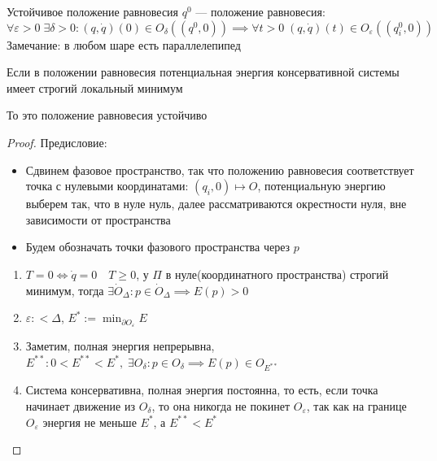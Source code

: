 \documentclass[crop=false]{standalone}
\begin{document}
\Def Устойчивое положение равновесия $q^0$ — положение равновесия:
\[\forall \varepsilon > 0 \; \exists \delta > 0: (q , \dot q)(0) \in O_\delta((q^0, 0)) \implies \forall t > 0 \; (q , \dot q)(t) \in O_\varepsilon((q_i^0, 0)) \]
Замечание: в любом шаре есть параллелепипед
\begin{theorem}
    Если в положении равновесия потенциальная энергия консервативной системы имеет строгий локальный минимум
    
    То это положение равновесия устойчиво
\end{theorem}
\begin{proof}
    Предисловие:
    \begin{itemize}
        \item 
        Сдвинем фазовое пространство, так что положению равновесия соответствует точка с нулевыми координатами: $(q_i, 0) \mapsto O$, потенциальную энергию выберем так, что в нуле нуль, далее рассматриваются окрестности нуля, вне зависимости от пространства
        \item
        Будем обозначать точки фазового пространства через $p$
    \end{itemize}
    \begin{enumerate}
        \item 
        $T = 0 \iff \dot q = 0 \quad T \ge 0$, у $\Pi$ в нуле(координатного пространства) строгий минимум, тогда $\exists \dot O_\Delta : p \in \dot O_\Delta \implies E(p) > 0$
        \item
        $\varepsilon :< \Delta$, $E^* := \min_{\partial O_\varepsilon} E$
        \item
        Заметим, полная энергия непрерывна, $E^{**}: 0 < E^{**} < E^*, \; \exists O_\delta: p \in O_\delta \implies E(p) \in O_{E^{**}}$
        \item
        Система консервативна, полная энергия постоянна, то есть, 
        если точка начинает движение из $O_\delta$, то она никогда не покинет $O_\varepsilon$, так как на границе $O_\varepsilon$ энергия не меньше $E^*$, а $E^{**} < E^*$
    \end{enumerate}
\end{proof}
\end{document}
